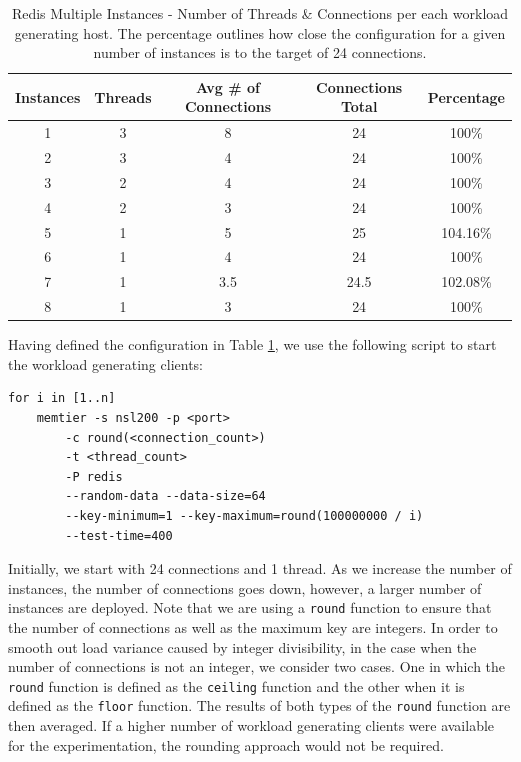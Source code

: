 \begin{table}[h!]
\centering
 \begin{tabular}{| c || c c || c c |}
 \hline
 Instances & Threads & Avg \# of Connections & Connections Total & Percentage \\ [0.5ex]
 \hline\hline

1 & 3 & 8 & 24 & 100\% \\ \hline
2 & 3 & 4 & 24 & 100\% \\ \hline
3 & 2 & 4 & 24 & 100\% \\ \hline
4 & 2 & 3 & 24 & 100\% \\ \hline
5 & 1 & 5 & 25 & 104.16\% \\ \hline
6 & 1 & 4 & 24 & 100\% \\ \hline
7 & 1 & 3.5 & 24.5 & 102.08\% \\ \hline
8 & 1 & 3 & 24 & 100\% \\ \hline

\end{tabular}
\caption{Redis Multiple Instances - Number of Threads \& Connections per each workload generating host. The percentage outlines how close the configuration for a given number of instances is to the target of 24 connections.}
\label{tab:redis_threads_load}
\end{table}

Having defined the configuration in Table \ref{tab:redis_threads_load}, we use the following script to start the workload generating clients:

\begin{lstlisting}
for i in [1..n]
    memtier -s nsl200 -p <port>
        -c round(<connection_count>)
        -t <thread_count>
        -P redis
        --random-data --data-size=64
        --key-minimum=1 --key-maximum=round(100000000 / i)
        --test-time=400
\end{lstlisting}

Initially, we start with 24 connections and 1 thread. As we increase the number of instances, the number of connections goes down, however, a larger number of instances are deployed. Note that we are using a \texttt{round} function to ensure that the number of connections as well as the maximum key are integers. In order to smooth out load variance caused by integer divisibility, in the case when the number of connections is not an integer, we consider two cases. One in which the \texttt{round} function is defined as the \texttt{ceiling} function and the other when it is defined as the \texttt{floor} function. The results of both types of the \texttt{round} function are then averaged. If a higher number of workload generating clients were available for the experimentation, the rounding approach would not be required.

